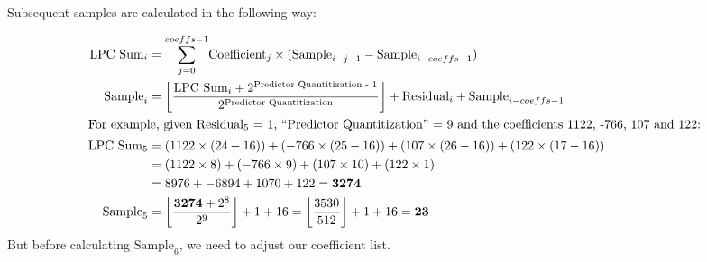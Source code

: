 Subsequent samples are calculated in the following way:

\begin{align*}
\text{LPC Sum}_i &= \overset{coeffs - 1}{\underset{j = 0}{\sum}}
\text{Coefficient}_j \times (\text{Sample}_{i - j - 1} - \text{Sample}_{i - coeffs - 1}) \\
\text{Sample}_i &= \left\lfloor \frac{\text{LPC Sum}_i + 2^{\text{Predictor Quantitization - 1}}} {2 ^ \text{Predictor Quantitization}}\right\rfloor + \text{Residual}_i + \text{Sample}_{i - coeffs - 1} \\
\intertext{For example, given $\text{Residual}_5$ = 1,
``{Predictor Quantitization}'' = 9
and the coefficients 1122, -766, 107 and 122:}
\text{LPC Sum}_5 &=
(1122 \times (24 - 16)) + (-766 \times (25 - 16)) +
 (107 \times (26 - 16)) + (122 \times (17 - 16)) \\
&= (1122 \times 8) + (-766 \times 9) + (107 \times 10) + (122 \times 1) \\
&= 8976 + -6894 + 1070 + 122 = \textbf{3274} \\
\text{Sample}_5 &= \left\lfloor\frac{\textbf{3274} + 2^8}{2^9}\right\rfloor + 1 + 16
= \left\lfloor\frac{3530}{512}\right\rfloor + 1 + 16 = \textbf{23}
\end{align*}
But before calculating $\text{Sample}_6$,
we need to adjust our coefficient list.

